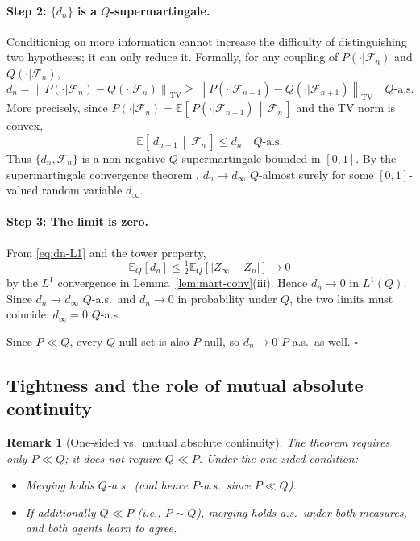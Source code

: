 \documentclass[12pt]{article}
\newtheorem{remark}[theorem]{Remark}
\newcommand{\E}{\mathbb{E}}
\newcommand{\Ec}[2]{\mathbb{E}\!\left[\,#1\,\middle|\,#2\,\right]}
\newcommand{\TV}[1]{\left\|#1\right\|_{\mathrm{TV}}}
\begin{document}
\paragraph{Step 2: $\{d_n\}$ is a $Q$-supermartingale.}

Conditioning on more information cannot increase the difficulty of
distinguishing two hypotheses; it can only reduce it.  Formally,
for any coupling of $P(\cdot|\mathscr{F}_n)$ and $Q(\cdot|\mathscr{F}_n)$,
\[
d_n = \TV{P(\cdot|\mathscr{F}_n) - Q(\cdot|\mathscr{F}_n)}
\geq \TV{P(\cdot|\mathscr{F}_{n+1}) - Q(\cdot|\mathscr{F}_{n+1})}
\quad Q\text{-a.s.}
\]
More precisely, since $P(\cdot|\mathscr{F}_n) = \Ec{P(\cdot|\mathscr{F}_{n+1})}{\mathscr{F}_n}$
and the TV norm is convex,
\begin{equation}
\label{eq:supermg}
\Ec{d_{n+1}}{\mathscr{F}_n} \leq d_n \quad Q\text{-a.s.}
\end{equation}
Thus $\{d_n, \mathscr{F}_n\}$ is a non-negative $Q$-supermartingale bounded
in $[0,1]$.  By the supermartingale convergence theorem
\citep{doob1953}, $d_n \to d_\infty$ $Q$-almost surely for some
$[0,1]$-valued random variable $d_\infty$.

\paragraph{Step 3: The limit is zero.}

From \eqref{eq:dn-L1} and the tower property,
\[
\E_Q[d_n] \leq \tfrac{1}{2}\E_Q[|Z_\infty - Z_n|] \to 0
\]
by the $L^1$ convergence in Lemma~\ref{lem:mart-conv}(iii).  Hence
$d_n \to 0$ in $L^1(Q)$.  Since $d_n \to d_\infty$ $Q$-a.s.\ and
$d_n \to 0$ in probability under $Q$, the two limits must coincide:
$d_\infty = 0$ $Q$-a.s.

Since $P \ll Q$, every $Q$-null set is also $P$-null, so
$d_n \to 0$ $P$-a.s.\ as well. \hfill$\square$

\subsection{Tightness and the role of mutual absolute continuity}

\begin{remark}[One-sided vs.\ mutual absolute continuity]
The theorem requires only $P \ll Q$; it does not require $Q \ll P$.
Under the one-sided condition:
\begin{itemize}
\item Merging holds $Q$-a.s.\ (and hence $P$-a.s.\ since $P \ll Q$).
\item If additionally $Q \ll P$ (i.e., $P \sim Q$), merging holds a.s.\
      under both measures, and both agents learn to agree.
\end{itemize}
\end{remark}
\end{document}
